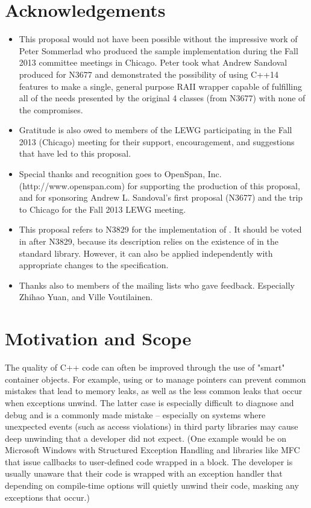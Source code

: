 \documentclass[ebook,11pt,article]{memoir}
\begin{document}
\chapter{Acknowledgements}
\begin{itemize}
\item This proposal would not have been possible without the impressive work of Peter Sommerlad who produced the sample implementation during the Fall 2013 committee meetings in Chicago.  Peter took what Andrew Sandoval produced for N3677 and demonstrated the possibility of using C++14 features to make a single, general purpose RAII wrapper capable of fulfilling all of the needs presented by the original 4 classes (from N3677) with none of the compromises.
\item Gratitude is also owed to members of the LEWG participating in the Fall 2013 (Chicago) meeting for their support, encouragement, and suggestions that have led to this proposal.
\item Special thanks and recognition goes to OpenSpan, Inc. (http://www.openspan.com) for supporting the production of this proposal, and for sponsoring Andrew L. Sandoval's first proposal (N3677) and the trip to Chicago for the Fall 2013 LEWG meeting.
\item This proposal refers to N3829 for the implementation of . It should be voted in after N3829, because its description relies on the existence of  in the standard library. However, it can also be applied independently with appropriate changes to the specification.
\item Thanks also to members of the mailing lists who gave feedback. Especially Zhihao Yuan, and Ville Voutilainen.
\end{itemize}

\chapter{Motivation and Scope}
The quality of C++ code can often be improved through the use of "smart" container objects.  For example, using  or  to manage pointers can prevent common mistakes that lead to memory leaks, as well as the less common leaks that occur when exceptions unwind.  The latter case is especially difficult to diagnose and debug and is a commonly made mistake -- especially on systems where unexpected events (such as access violations) in third party libraries may cause deep unwinding that a developer did not expect.  (One example would be on Microsoft Windows with Structured Exception Handling and libraries like MFC that issue callbacks to user-defined code wrapped in a  block.  The developer is usually unaware that their code is wrapped with an exception handler that depending on compile-time options will quietly unwind their code, masking any exceptions that occur.)
\end{document}
